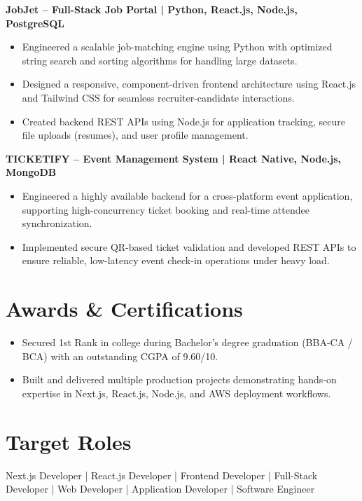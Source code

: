 \documentclass[a4paper,10pt]{article}
\begin{document}
\textbf{JobJet -- Full-Stack Job Portal | Python, React.js, Node.js, PostgreSQL}

\begin{itemize}[leftmargin=*]
    \item Engineered a scalable job-matching engine using Python with optimized string search and sorting algorithms for handling large datasets.
    \item Designed a responsive, component-driven frontend architecture using React.js and Tailwind CSS for seamless recruiter-candidate interactions.
    \item Created backend REST APIs using Node.js for application tracking, secure file uploads (resumes), and user profile management.
\end{itemize}

\textbf{TICKETIFY -- Event Management System | React Native, Node.js, MongoDB}

\begin{itemize}[leftmargin=*]
    \item Engineered a highly available backend for a cross-platform event application, supporting high-concurrency ticket booking and real-time attendee synchronization.
    \item Implemented secure QR-based ticket validation and developed REST APIs to ensure reliable, low-latency event check-in operations under heavy load.
\end{itemize}
\section*{Awards \& Certifications}

\begin{itemize}[leftmargin=*]
    \item Secured 1st Rank in college during Bachelor's degree graduation (BBA-CA / BCA) with an outstanding CGPA of 9.60/10.
    \item Built and delivered multiple production projects demonstrating hands-on expertise in Next.js, React.js, Node.js, and AWS deployment workflows.
\end{itemize}

\section*{Target Roles}

Next.js Developer | React.js Developer | Frontend Developer | Full-Stack Developer | Web Developer | Application Developer | Software Engineer
\end{document}
